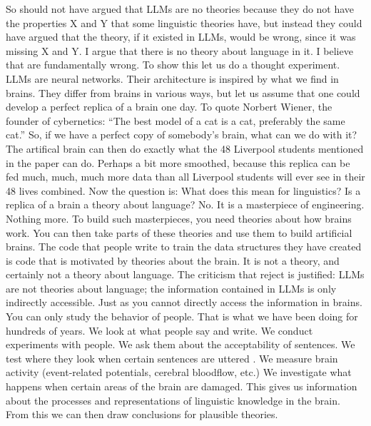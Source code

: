 So \citet{FoxKatzir2024a} should not have argued that LLMs are no theories because they do not have
the properties X and Y that some linguistic theories have, but instead they could have argued that
the theory, if it existed in LLMs, would be wrong, since it was missing X and Y. I argue that
there is no theory about language in it. I believe that \citet{AmbridgeBlything2024a} are
fundamentally wrong. To show this let us do a thought experiment. LLMs are neural networks. Their
architecture is inspired by what we find in brains. They differ from brains in various ways, but let
us assume that one could develop a perfect replica of a brain one day. To quote
Norbert Wiener, the founder of cybernetics: ``The best model of a cat is a cat, preferably the same
cat.''
So, if we have a perfect copy of somebody's brain, what can we do with it? The artifical brain can then do exactly what
the 48 Liverpool students mentioned in the  paper can do. Perhaps a
bit more smoothed, because this replica can be fed much, much, much more data than all Liverpool
students will ever see in their 48 lives combined. Now the question is: What does this mean for
linguistics? Is a replica of a brain a theory about language? No. It is a masterpiece of
engineering. Nothing more. To build such masterpieces, you need theories about how brains work. You can then take parts of these theories and use them to build
artificial brains. The code that people write to train the data structures they have created is code
that is motivated by theories about the brain. It is not a theory, and certainly not a theory about
language. The criticism that  reject is justified: LLMs are not
theories about language; the information contained in LLMs is only indirectly accessible. Just as
you cannot directly access the information in brains. You can only study the behavior of
people. That is what we have been doing for hundreds of years. We look at what people say and write. We
conduct experiments with people. We ask them about the acceptability of sentences. We test where
they look when certain sentences are uttered \citep{TSKES96a}. We measure brain activity (event-related potentials,
cerebral bloodflow, etc.) We investigate what happens when certain areas of the brain are damaged.
This gives us information about the processes and representations of linguistic knowledge in the
brain. From this we can then draw conclusions for plausible theories.  

